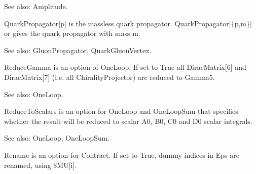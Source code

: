 See also:  Amplitude.



QuarkPropagator[p] is the massless quark propagator. QuarkPropagator[\{p,m\}] or gives the quark propagator with mass m.



See also:  GluonPropagator, QuarkGluonVertex.










ReduceGamma is an option of OneLoop. If set to True all DiracMatrix[6] and DiracMatrix[7] (i.e. all ChiralityProjector) are reduced to
  Gamma5.

See also:  OneLoop.



ReduceToScalars is an option for OneLoop { }and OneLoopSum that specifies whether the result will be reduced to scalar A0, B0, C0 and D0
  scalar integrals.

See also:  OneLoop, OneLoopSum.



Rename is an option for Contract. If set to True, dummy indices in Eps are renamed, using \${}MU[i].

